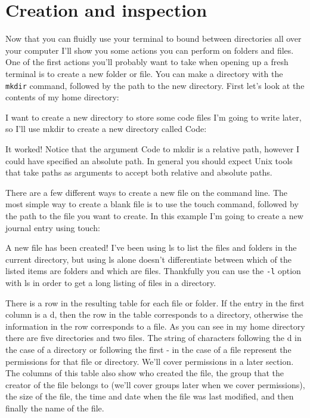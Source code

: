 \section{Creation and inspection}

Now that you can fluidly use your terminal to bound between directories all over your computer I’ll show you some actions you can perform on folders and files. One of the first actions you’ll probably want to take when opening up a fresh terminal is to create a new folder or file. You can make a directory with the \texttt{mkdir} command, followed by the path to the new directory. First let’s look at the contents of my home directory:

I want to create a new directory to store some code files I’m going to write later, so I’ll use mkdir to create a new directory called Code:

It worked! Notice that the argument Code to mkdir is a relative path, however I could have specified an absolute path. In general you should expect Unix tools that take paths as arguments to accept both relative and absolute paths.

There are a few different ways to create a new file on the command line. The most simple way to create a blank file is to use the touch command, followed by the path to the file you want to create. In this example I’m going to create a new journal entry using touch:

A new file has been created! I’ve been using ls to list the files and folders in the current directory, but using ls alone doesn’t differentiate between which of the listed items are folders and which are files. Thankfully you can use the \texttt{-l} option with ls in order to get a long listing of files in a directory.

There is a row in the resulting table for each file or folder. If the entry in the first column is a d, then the row in the table corresponds to a directory, otherwise the information in the row corresponds to a file. As you can see in my home directory there are five directories and two files. The string of characters following the d in the case of a directory or following the first - in the case of a file represent the permissions for that file or directory. We’ll cover permissions in a later section. The columns of this table also show who created the file, the group that the creator of the file belongs to (we’ll cover groups later when we cover permissions), the size of the file, the time and date when the file was last modified, and then finally the name of the file.

